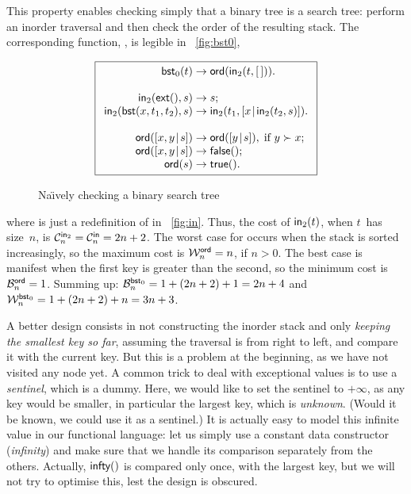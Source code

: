 This property enables checking simply that a binary tree is a search
tree: perform an inorder traversal and then check the order of the
resulting stack. The corresponding function,
, is legible in
\fig~\vref{fig:bst0},
\begin{figure}[t]
\begin{equation*}
\boxed{
\begin{array}{r@{\;}l@{\;}l}
\fun{bst}_0(t) & \rightarrow & \fun{ord}(\fun{in}_2(t,\el)).\\
\\
\fun{in}_2(\fun{ext}(),s) & \rightarrow & s;\\
\fun{in}_2(\fun{bst}(x,t_1,t_2),s) & \rightarrow
  & \fun{in}_2(t_1,\cons{x}{\fun{in}_2(t_2,s)}).\\
\\
\fun{ord}(\cons{x,y}{s}) & \rightarrow & \fun{ord}(\cons{y}{s}),
\;\text{if \(y \succ x\)};\\
\fun{ord}(\cons{x,y}{s}) & \rightarrow & \fun{false}();\\
\fun{ord}(s) & \rightarrow & \fun{true}().
\end{array}}
\end{equation*}
\caption{Na\"{\i}vely checking a binary search tree\label{fig:bst0}}
\end{figure}
where  is just a
redefinition of  in
\fig~\vref{fig:in}. Thus, the cost of \(\fun{in}_2(t)\), when
\(t\)~has size~\(n\), is \(\C{\fun{in}_2}{n} = \C{\fun{in}}{n} = 2n +
2\). The worst case for  occurs when
the stack is sorted increasingly, so the maximum cost is
\(\W{\fun{ord}}{n} = n\), if \(n > 0\). The best case is manifest when
the first key is greater than the second, so the minimum cost is
\(\B{\fun{ord}}{n} = 1\). Summing up: \(\B{\fun{bst}_0}{n} = 1 +
(2n+2) + 1 = 2n + 4\) and \(\W{\fun{bst}_0}{n} = 1 + (2n+2) + n = 3n +
3\).

A better design consists in not constructing the inorder stack and
only \emph{keeping the smallest key so far}, assuming the traversal is
from right to left, and compare it with the current key. But this is a
problem at the beginning, as we have not visited any node yet. A
common trick to deal with exceptional values is to use a
\emph{sentinel}, which is a dummy. Here, we would like
to set the sentinel to \(+\infty\), as any key would be smaller, in
particular the largest key, which is \emph{unknown}. (Would it be
known, we could use it as a sentinel.) It is actually easy to model
this infinite value in our functional language: let us simply use a
constant data constructor 
(\emph{infinity}) and make sure that we handle its comparison
separately from the others. Actually,
\(\fun{infty}()\) is compared only once,
with the largest key, but we will not try to optimise this, lest the
design is obscured.

